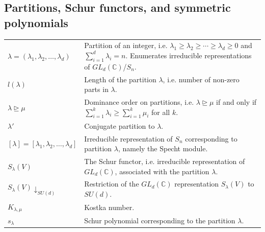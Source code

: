 \documentclass[11pt,letterpaper]{article}
\theoremstyle{plain}
\theoremstyle{plain}
\theoremstyle{plain}
\theoremstyle{plain}
\theoremstyle{plain}
\theoremstyle{plain}
\theoremstyle{plain}
\theoremstyle{definition}
\theoremstyle{plain}
\begin{document}
\subsection*{Partitions, Schur functors, and symmetric polynomials}

\begin{tabular}{@{}ll@{}}

\parbox[t]{0.22\textwidth}{$\lambda=(\lambda_1,\lambda_2,\ldots,\lambda_d)$} & \parbox[t]{0.72\textwidth}{Partition of an integer, i.e. $\lambda_1\geq \lambda_2 \geq \cdots \geq \lambda_d\geq 0$ and $\sum_{i=1}^d \lambda_i=n$. Enumerates irreducible representations of $GL_d(\mathbb{C})$/$S_n$.} \\[0.6em]

\parbox[t]{0.22\textwidth}{$l(\lambda)$} & \parbox[t]{0.72\textwidth}{Length of the partition $\lambda$, i.e. number of non-zero parts in $\lambda$.} \\[0.6em]

\parbox[t]{0.22\textwidth}{$\lambda \unrhd \mu$} & \parbox[t]{0.72\textwidth}{Dominance order on partitions, i.e. $\lambda \unrhd \mu$ if and only if $\sum_{i=1}^k \lambda_i \geq \sum_{i=1}^k \mu_i$ for all $k$.} \\[0.6em]

\parbox[t]{0.22\textwidth}{$\lambda'$} & \parbox[t]{0.72\textwidth}{Conjugate partition to $\lambda$.} \\[0.6em]

\parbox[t]{0.22\textwidth}{$[\lambda]=[\lambda_1,\lambda_2,\ldots,\lambda_d]$} & \parbox[t]{0.72\textwidth}{Irreducible representation of $S_n$ corresponding to partition $\lambda$, namely the Specht module.} \\[0.6em]

\parbox[t]{0.22\textwidth}{$S_{\lambda}(V)$} & \parbox[t]{0.72\textwidth}{The Schur functor, i.e. irreducible representation of $GL_d(\mathbb{C})$, associated with the partition $\lambda$.} \\[0.6em]

\parbox[t]{0.22\textwidth}{$S_\lambda(V) \downarrow_{S U(d)}$} & \parbox[t]{0.72\textwidth}{Restriction of the $GL_d(\mathbb{C})$ representation $S_\lambda(V)$ to $SU(d)$.} \\[0.6em]

\parbox[t]{0.22\textwidth}{$K_{\lambda, \mu}$} & \parbox[t]{0.72\textwidth}{Kostka number.} \\[0.6em]

\parbox[t]{0.22\textwidth}{$s_{\lambda}$} & \parbox[t]{0.72\textwidth}{Schur polynomial corresponding to the partition $\lambda$.} \\[0.6em]


\end{tabular}
\end{document}
